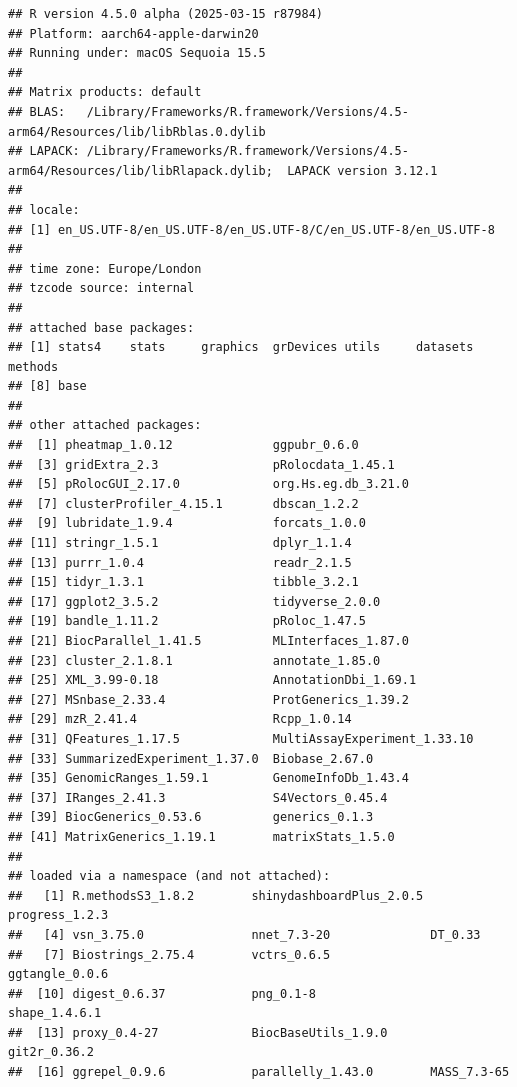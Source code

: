 \documentclass[9pt,a4paper,]{extarticle}
\begin{document}
\begin{verbatim}
## R version 4.5.0 alpha (2025-03-15 r87984)
## Platform: aarch64-apple-darwin20
## Running under: macOS Sequoia 15.5
## 
## Matrix products: default
## BLAS:   /Library/Frameworks/R.framework/Versions/4.5-arm64/Resources/lib/libRblas.0.dylib 
## LAPACK: /Library/Frameworks/R.framework/Versions/4.5-arm64/Resources/lib/libRlapack.dylib;  LAPACK version 3.12.1
## 
## locale:
## [1] en_US.UTF-8/en_US.UTF-8/en_US.UTF-8/C/en_US.UTF-8/en_US.UTF-8
## 
## time zone: Europe/London
## tzcode source: internal
## 
## attached base packages:
## [1] stats4    stats     graphics  grDevices utils     datasets  methods  
## [8] base     
## 
## other attached packages:
##  [1] pheatmap_1.0.12              ggpubr_0.6.0                
##  [3] gridExtra_2.3                pRolocdata_1.45.1           
##  [5] pRolocGUI_2.17.0             org.Hs.eg.db_3.21.0         
##  [7] clusterProfiler_4.15.1       dbscan_1.2.2                
##  [9] lubridate_1.9.4              forcats_1.0.0               
## [11] stringr_1.5.1                dplyr_1.1.4                 
## [13] purrr_1.0.4                  readr_2.1.5                 
## [15] tidyr_1.3.1                  tibble_3.2.1                
## [17] ggplot2_3.5.2                tidyverse_2.0.0             
## [19] bandle_1.11.2                pRoloc_1.47.5               
## [21] BiocParallel_1.41.5          MLInterfaces_1.87.0         
## [23] cluster_2.1.8.1              annotate_1.85.0             
## [25] XML_3.99-0.18                AnnotationDbi_1.69.1        
## [27] MSnbase_2.33.4               ProtGenerics_1.39.2         
## [29] mzR_2.41.4                   Rcpp_1.0.14                 
## [31] QFeatures_1.17.5             MultiAssayExperiment_1.33.10
## [33] SummarizedExperiment_1.37.0  Biobase_2.67.0              
## [35] GenomicRanges_1.59.1         GenomeInfoDb_1.43.4         
## [37] IRanges_2.41.3               S4Vectors_0.45.4            
## [39] BiocGenerics_0.53.6          generics_0.1.3              
## [41] MatrixGenerics_1.19.1        matrixStats_1.5.0           
## 
## loaded via a namespace (and not attached):
##   [1] R.methodsS3_1.8.2        shinydashboardPlus_2.0.5 progress_1.2.3          
##   [4] vsn_3.75.0               nnet_7.3-20              DT_0.33                 
##   [7] Biostrings_2.75.4        vctrs_0.6.5              ggtangle_0.0.6          
##  [10] digest_0.6.37            png_0.1-8                shape_1.4.6.1           
##  [13] proxy_0.4-27             BiocBaseUtils_1.9.0      git2r_0.36.2            
##  [16] ggrepel_0.9.6            parallelly_1.43.0        MASS_7.3-65             

\end{verbatim}
\end{document}
